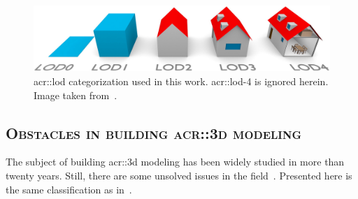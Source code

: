             \begin{figure}[htpb]
                \centering
                \includegraphics[width=.7\textwidth]{images/introduction/lods}            
                \caption[
                    \acrshort*{acr::lod} categorization used in this work.
                ]{
                    \label{fig::lods}
                    \gls{acr::lod} categorization used in this work.
                    \gls{acr::lod}-4 is ignored herein.
                    Image taken from~\parencite{biljecki2016improved}.
                }
            \end{figure}
    \subsection{\textsc{Obstacles in building \texorpdfstring{\gls*{acr::3d}}{3D} modeling}}
        \label{subsec::introduction::urban_3d_reconstruction::challenges}
        The subject of building \gls{acr::3d} modeling has been widely studied in more than twenty years.
        Still, there are some unsolved issues in the field~\parencite{musialski2013survey, lafarge2015some}.
        Presented here is the same classification as in~\textcite{lafarge2015some}.


